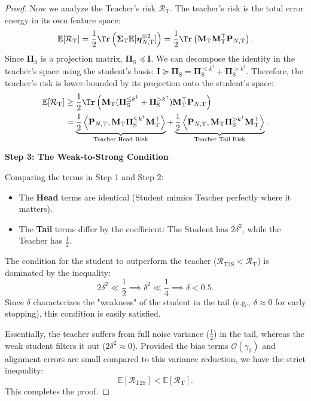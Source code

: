 \documentclass{article}
\theoremstyle{definition}
\theoremstyle{definition}
\theoremstyle{plain}
\theoremstyle{plain}
\theoremstyle{plain}
\theoremstyle{plain}
\theoremstyle{plain}
\newcommand{\bs}[1]{\boldsymbol{\mathbf{#1}}}
\newcommand{\Ex}{\mathbb{E}}
\newcommand{\te}{\mathrm{T}}
\newcommand{\st}{\mathrm{S}}
\newcommand{\M}{\mathbf{M}}
\newcommand{\id}{\mathbf{I}}
\newcommand{\inner}[1]{\left\langle#1\right\rangle}
\begin{document}
\begin{proof}
    Now we analyze the Teacher's risk $\mathcal{R}_{\mathrm{T}}$. The teacher's risk is the total error energy in its own feature space:
    \begin{equation}
        \Ex[\mathcal{R}_{\mathrm{T}}] = \frac{1}{2} \Tr\left( \bs\Sigma_\te \Ex[\bs\eta_{N,\te}^{\otimes 2}] \right) = \frac{1}{2} \Tr\left( \M_\te \M_\te^\top \bs P_{N,\te} \right).
    \end{equation}
    Since $\bs \Pi_\st$ is a projection matrix, $\bs \Pi_\st \preceq \id$. We can decompose the identity in the teacher's space using the student's basis: $\id \succeq \bs \Pi_\st = \bs \Pi_\st^{\le k^\dagger} + \bs \Pi_\st^{> k^\dagger}$.
    Therefore, the teacher's risk is lower-bounded by its projection onto the student's space:
    \begin{equation}
    \begin{aligned}
        \Ex[\mathcal{R}_{\mathrm{T}}] &\geq \frac{1}{2} \Tr\left( \M_\te (\bs \Pi_\st^{\le k^\dagger} + \bs \Pi_\st^{> k^\dagger}) \M_\te^\top \bs P_{N,\te} \right) \\
        &= \underbrace{\frac{1}{2}\inner{\bs P_{N,\te},\M_\te\bs \Pi_{\st}^{\leq k^\dagger}\M_\te^\top}}_{\text{Teacher Head Risk}} + \underbrace{\frac{1}{2}\inner{\bs P_{N,\te},\M_\te\bs \Pi_{\st}^{> k^\dagger}\M_\te^\top}}_{\text{Teacher Tail Risk}}.
    \end{aligned}
    \end{equation}

    \textbf{Step 3: The Weak-to-Strong Condition}
    
    Comparing the terms in Step 1 and Step 2:
    \begin{itemize}
        \item The \textbf{Head} terms are identical (Student mimics Teacher perfectly where it matters).
        \item The \textbf{Tail} terms differ by the coefficient: The Student has $2\delta^2$, while the Teacher has $\frac{1}{2}$.
    \end{itemize}
    
    The condition for the student to outperform the teacher ($\mathcal{R}_{\mathrm{T2S}} < \mathcal{R}_{\mathrm{T}}$) is dominated by the inequality:
    \begin{equation}
        2\delta^2 \ll \frac{1}{2} \implies \delta^2 \ll \frac{1}{4} \implies \delta < 0.5.
    \end{equation}
    Since $\delta$ characterizes the "weakness" of the student in the tail (e.g., $\delta \approx 0$ for early stopping), this condition is easily satisfied.
    
    Essentially, the teacher suffers from full noise variance ($\frac{1}{2}$) in the tail, whereas the weak student filters it out ($2\delta^2 \approx 0$). Provided the bias terms $\mathcal{O}(\gamma_0)$ and alignment errors are small compared to this variance reduction, we have the strict inequality:
    \begin{equation}
        \Ex[\mathcal{R}_{\mathrm{T2S}}] < \Ex[\mathcal{R}_{\mathrm{T}}].
    \end{equation}
    This completes the proof.
\end{proof}
\end{document}
